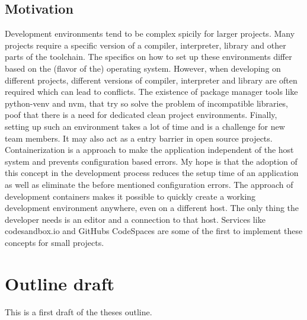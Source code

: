 \documentclass[12pt, a4paper]{article}
\begin{document}
\subsection{Motivation}
Development environments tend to be complex spicily for larger projects. Many projects require a specific version of a compiler, interpreter, library and other parts of the toolchain. The specifics on how to set up these environments differ based on the (flavor of the) operating system. However, when developing on different projects, different versions of compiler, interpreter and library are often required which can lead to conflicts. The existence of package manager tools like \ac*{python-venv} and \ac{nvm}, that try so solve the problem of incompatible libraries, poof that there is a need for dedicated clean project environments.\newline
Finally, setting up such an environment takes a lot of time and is a challenge for new team members. It may also act as a entry barrier in open source projects.\newline
Containerization is a approach to make the application independent of the host system and prevents configuration based errors. My hope is that the adoption of this concept in the development process reduces the setup time of an application as well as eliminate the before mentioned configuration errors. The approach of development containers makes it possible to quickly create a working development environment anywhere, even on a different host. The only thing the developer needs is an editor and a connection to that host. Services like codesandbox.io and GitHubs CodeSpaces are some of the first to implement these concepts for small projects.
\section{Outline draft}
This is a first draft of the theses outline.
\end{document}
